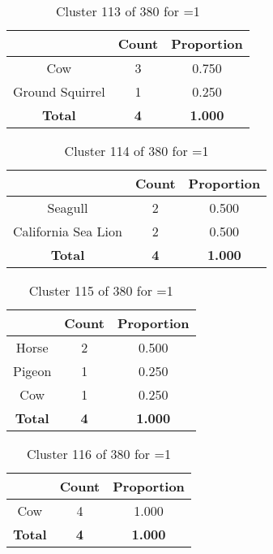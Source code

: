 \begin{table}[ht!]
\centering
\begin{tabular}{|c|c|c|}
\hline
\bf \Spec{} &\bf Count &\bf Proportion\\ \hline \hline
Cow & 3 & 0.750\\ \hline
Ground Squirrel & 1 & 0.250\\ \hline
\hline
\bf Total & \bf 4 & \bf 1.000\\ \hline
\end{tabular}
\label{tab:cluster:113:1}
\caption{Cluster 113 of 380 for \minneigh{}=1}
\end{table}

\begin{table}[ht!]
\centering
\begin{tabular}{|c|c|c|}
\hline
\bf \Spec{} &\bf Count &\bf Proportion\\ \hline \hline
Seagull & 2 & 0.500\\ \hline
California Sea Lion & 2 & 0.500\\ \hline
\hline
\bf Total & \bf 4 & \bf 1.000\\ \hline
\end{tabular}
\label{tab:cluster:114:1}
\caption{Cluster 114 of 380 for \minneigh{}=1}
\end{table}

\begin{table}[ht!]
\centering
\begin{tabular}{|c|c|c|}
\hline
\bf \Spec{} &\bf Count &\bf Proportion\\ \hline \hline
Horse & 2 & 0.500\\ \hline
Pigeon & 1 & 0.250\\ \hline
Cow & 1 & 0.250\\ \hline
\hline
\bf Total & \bf 4 & \bf 1.000\\ \hline
\end{tabular}
\label{tab:cluster:115:1}
\caption{Cluster 115 of 380 for \minneigh{}=1}
\end{table}

\begin{table}[ht!]
\centering
\begin{tabular}{|c|c|c|}
\hline
\bf \Spec{} &\bf Count &\bf Proportion\\ \hline \hline
Cow & 4 & 1.000\\ \hline
\hline
\bf Total & \bf 4 & \bf 1.000\\ \hline
\end{tabular}
\label{tab:cluster:116:1}
\caption{Cluster 116 of 380 for \minneigh{}=1}
\end{table}

